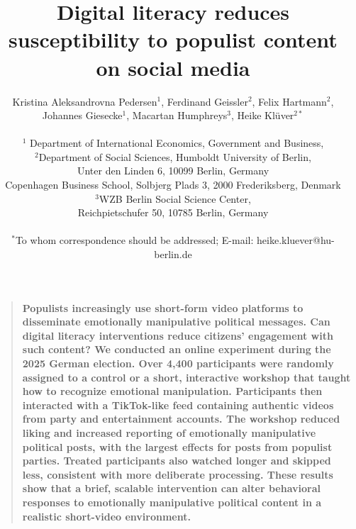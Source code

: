 \documentclass[12pt]{article}
\title{Digital literacy reduces susceptibility to populist content on social media}
\author
{Kristina Aleksandrovna Pedersen$^{1}$, Ferdinand Geissler$^{2}$, Felix Hartmann$^{2}$, \\Johannes Giesecke$^{1}$, Macartan Humphreys$^{3}$, Heike Klüver$^{2\ast}$\\
\\
\normalsize{$^{1}$ Department of International Economics, Government and Business,}\\ 
\normalsize{$^{2}$Department of Social Sciences, Humboldt University of Berlin,}\\
\normalsize{Unter den Linden 6, 10099 Berlin, Germany}\\
\normalsize{Copenhagen Business School, Solbjerg Plads 3, 2000 Frederiksberg, Denmark}\\
\normalsize{$^{3}$WZB Berlin Social Science Center,}\\
\normalsize{Reichpietschufer 50, 10785 Berlin, Germany}\\
\\
\normalsize{$^\ast$To whom correspondence should be addressed; E-mail:  
heike.kluever@hu-berlin.de}
}
\date{}
\newenvironment{sciabstract}{%
\begin{quote} \bf}
{\end{quote}}
\begin{document}
 


\baselineskip24pt


\maketitle 






\begin{sciabstract}
Populists increasingly use short-form video platforms to disseminate emotionally manipulative political messages. Can digital literacy interventions reduce citizens’ engagement with such content? We conducted an online experiment during the 2025 German election. Over 4,400 participants were randomly assigned to a control or a short, interactive workshop that taught how to recognize emotional manipulation. Participants then interacted with a TikTok-like feed containing authentic videos from party and entertainment accounts. The workshop reduced liking and increased reporting of emotionally manipulative political posts, with the largest effects for posts from populist parties. Treated participants also watched longer and skipped less, consistent with more deliberate processing. These results show that a brief, scalable intervention can alter behavioral responses to emotionally manipulative political content in a realistic short-video environment.
\end{sciabstract}
\end{document}

